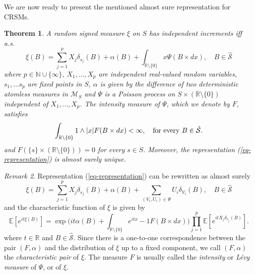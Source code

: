 \documentclass{article}
\theoremstyle{plain}
\newtheorem{theorem}{Theorem}[section]
\theoremstyle{remark}
\newtheorem{remark}[theorem]{Remark}
\begin{document}
We are now ready to present the mentioned almost sure representation for CRSMs.
\begin{theorem}\label{thm-representation}
	A random signed measure $\xi$ on $S$ has independent increments iff a.s.
	\begin{equation}\label{eq-representation}
		\xi (B)=\sum_{j=1}^p X_j\delta_{s_j}(B)+\alpha(B)+\int_{\mathbb{R}\setminus\{0\}}x\Psi(B\times dx),\quad B\in\hat{\mathcal{S}}
	\end{equation}
	where $p\in\mathbb{N}\cup\{\infty\}$, $X_1,...,X_p$ are independent real-valued random variables, $s_1,...s_p$ are fixed points in $S$, $\alpha$ is given by the difference of two deterministic atomless measures in $\mathcal{M}_S$ and $\Psi$ is a Poisson process on $S\times (\mathbb{R}\setminus\{0\})$ independent of $X_1,...,X_p$. The intensity measure of $\Psi$, which we denote by $F$, satisfies 
	\begin{equation}\label{eq-intensity-poisson}
		\int_{\mathbb{R}\setminus\{0\}}1\wedge|x| F(B\times dx)<\infty,\quad\textnormal{for every $B\in\hat{\mathcal{S}}$.}
	\end{equation}
	and $F(\{s\}\times (\mathbb{R}\setminus\{0\}))=0$ for every $s\in S$. Moreover, the representation (\ref{eq-representation}) is almost surely unique.
\end{theorem}
\begin{remark}
	Representation (\ref{eq-representation}) can be rewritten as almost surely
	\begin{equation*}
		\xi (B)=\sum_{j=1}^p X_j\delta_{s_j}(B)+\alpha(B)+\sum_{(V_i,U_i)\in \Psi}U_i\delta_{V_i}(B),\quad B\in\hat{\mathcal{S}}
	\end{equation*}
	and the characteristic function of $\xi$ is given by
	\begin{equation*}
		\mathbb{E}\left[e^{it\xi(B)}\right]=\exp\bigg(it\alpha(B) +\int_{\mathbb{R}\setminus\{0\}}e^{itx} -1F(B\times dx)\bigg)\prod_{j=1}^{p}\mathbb{E}\left[e^{it X_j\delta_{s_j}(B)}\right].
	\end{equation*}
	where $t\in\mathbb{R}$ and $B\in\hat{\mathcal{S}}$. Since there is a one-to-one correspondence between the pair $(F,\alpha)$ and the distribution of $\xi$ up to a fixed component, we call $(F,\alpha)$ the \textit{characteristic pair} of $\xi$. The measure $F$ is usually called the \textit{intensity} or \textit{L\'{e}vy measure} of $\Psi$, or of $\xi$.
\end{remark}
\end{document}

